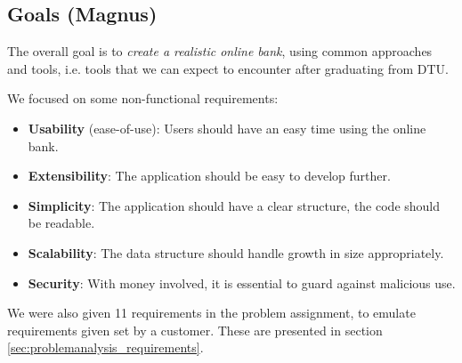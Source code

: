 \subsection{Goals (Magnus)}
The overall goal is to \textit{create a realistic online bank}, using common approaches and tools, i.e. tools that we can expect to encounter after graduating from DTU.

We focused on some non-functional requirements:
\begin{itemize}
\setlength\itemsep{0em}
\item \textbf{Usability} (ease-of-use): Users should have an easy time using the online bank.
\item \textbf{Extensibility}: The application should be easy to develop further.
\item \textbf{Simplicity}: The application should have a clear structure, the code should be readable.
\item \textbf{Scalability}: The data structure should handle growth in size appropriately.
\item \textbf{Security}: With money involved, it is essential to guard against malicious use.
\end{itemize}

We were also given 11 requirements in the problem assignment, to emulate requirements given set by a customer. These are presented in section  \ref{sec:problemanalysis_requirements}.